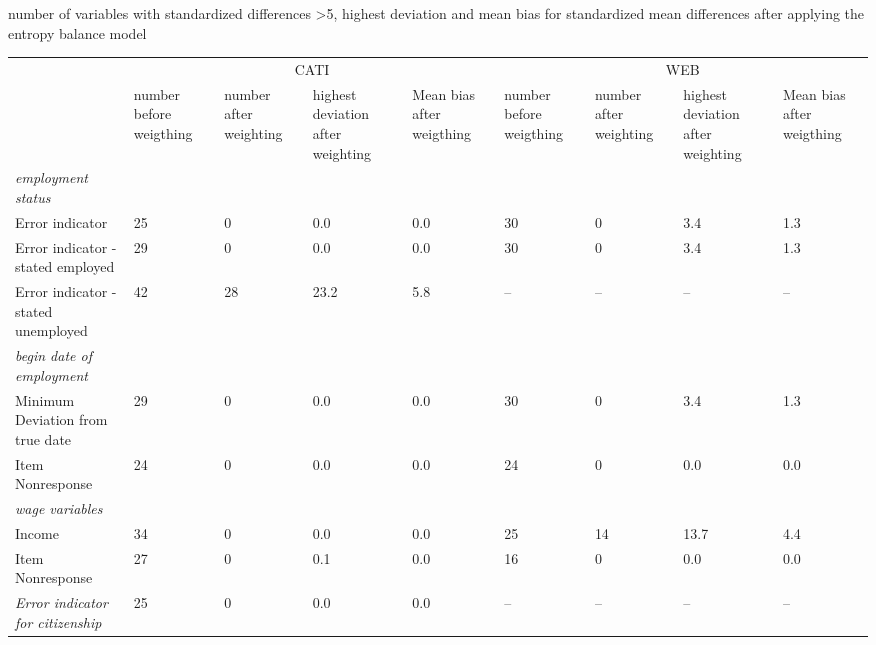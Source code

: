 \newpage
\begin{landscape}

\begin{threeparttable}
\caption{number of variables with standardized differences \textgreater 5, highest deviation and mean bias for standardized mean differences after applying the entropy balance model}
\label{tab:achieved_balance}
\begin{tabular}{p{5cm}p{1.5cm}p{1.5cm}p{1.5cm}p{1.5cm}p{1.5cm}p{1.5cm}p{1.5cm}p{1.5cm}} 
& \multicolumn{4}{c}{CATI} & \multicolumn{4}{c}{WEB}  \\ \addlinespace
\cmidrule(r{0.25em}){2-5} \cmidrule(l{0.25em}){6-9}						
	&	number before weigthing	&	number after weighting	&	highest deviation after weighting	&	Mean bias after weigthing	&	number before weigthing	&	number after weighting	&	highest deviation after weighting	&	Mean bias after weigthing	\\ \addlinespace
\textit{employment status}	&		&		&		&		&		&		&		&		\\ \hline \addlinespace
Error indicator	&	25	&	0	&	0.0	&	0.0	&	30	&	0	&	3.4	&	1.3	\\ \addlinespace
Error indicator \newline - stated employed	&	29	&	0	&	0.0	&	0.0	&	30	&	0	&	3.4	&	1.3	\\ \addlinespace
Error indicator \newline - stated unemployed	&	42	&	28	&	23.2	&	5.8	&	--	&	--	&	--	&	--	\\ \addlinespace
\textit{begin date of employment}	&		&		&		&		&		&		&		&		\\ \hline \addlinespace
Minimum Deviation from true date	&	29	&	0	&	0.0	&	0.0	&	30	&	0	&	3.4	&	1.3	\\ \addlinespace
Item Nonresponse	&	24	&	0	&	0.0	&	0.0	&	24	&	0	&	0.0	&	0.0	\\ \addlinespace
\textit{wage variables}	&		&		&		&		&		&		&		&		\\ \hline \addlinespace
Income	&	34	&	0	&	0.0	&	0.0	&	25	&	14	&	13.7	&	4.4	\\ \addlinespace
Item Nonresponse	&	27	&	0	&	0.1	&	0.0	&	16	&	0	&	0.0	&	0.0	\\ \addlinespace
\textit{Error indicator for citizenship}	&	25	&	0	&	0.0	&	0.0	&	--	&	--	&	--	&	--	\\ \bottomrule
\end{tabular}
\vspace{.5em}
    \begin{tablenotes}\small

    \end{tablenotes}
\end{threeparttable}
\end{landscape}

